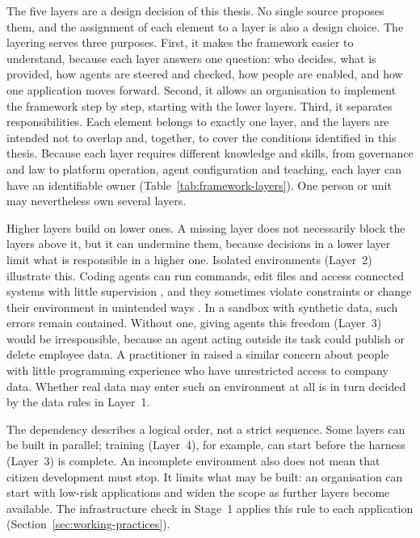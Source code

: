 \documentclass[10pt,a4paper]{article}
\begin{document}
The five layers are a design decision of this thesis. No single source
proposes them, and the assignment of each element to a layer is also a
design choice. The layering serves three purposes. First, it makes the
framework easier to understand, because each layer answers one
question: who decides, what is provided, how agents are steered and
checked, how people are enabled, and how one application moves forward.
Second, it allows an organisation to implement the framework step by
step, starting with the lower layers. Third, it separates
responsibilities. Each element belongs to exactly one layer, and the
layers are intended not to overlap and, together, to cover the
conditions identified in this thesis. Because each layer requires
different knowledge and skills, from governance and law to platform
operation, agent configuration and teaching, each layer can have an
identifiable owner (Table~\ref{tab:framework-layers}). One person or
unit may nevertheless own several layers.

Higher layers build on lower ones. A missing layer does not necessarily
block the layers above it, but it can undermine them, because decisions
in a lower layer limit what is responsible in a higher one. Isolated
environments (Layer~2) illustrate this. Coding agents can run commands,
edit files and access connected systems with little supervision
\parencite{galster2026}, and they sometimes violate constraints or
change their environment in unintended ways
\parencite{alhasan2026,uddin2026}. In a sandbox with synthetic data,
such errors remain contained. Without one, giving agents this freedom
(Layer~3) would be irresponsible, because an agent acting outside its
task could publish or delete employee data. A practitioner in
\textcite{viljoen2024} raised a similar concern about people with little
programming experience who have unrestricted access to company data.
Whether real data may enter such an environment at all is in turn
decided by the data rules in Layer~1.

The dependency describes a logical order, not a strict sequence. Some
layers can be built in parallel; training (Layer~4), for example, can
start before the harness (Layer~3) is complete. An incomplete
environment also does not mean that citizen development must stop. It
limits what may be built: an organisation can start with low-risk
applications and widen the scope as further layers become available.
The infrastructure check in Stage~1 applies this rule to each
application (Section~\ref{sec:working-practices}).
\end{document}
